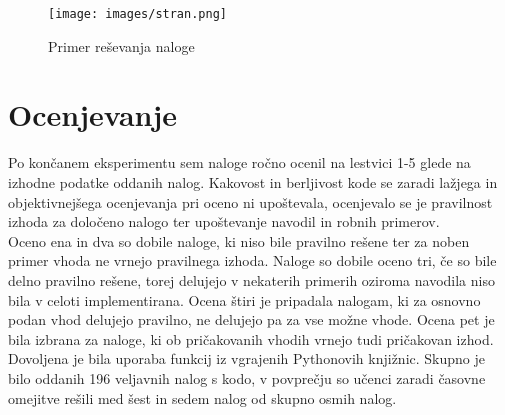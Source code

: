 \documentclass[a4paper,12pt,openright]{book}
\begin{document}
\begin{figure}[H]
    \centering
    \texttt{[image: images/stran.png]}
    \caption{Primer reševanja naloge}
    \label{fig:stran}
\end{figure}


\section{Ocenjevanje}
Po končanem eksperimentu sem naloge ročno ocenil na lestvici 1-5 glede na izhodne podatke oddanih nalog. Kakovost in berljivost kode se zaradi lažjega in objektivnejšega ocenjevanja pri oceno ni upoštevala, ocenjevalo se je pravilnost izhoda za določeno nalogo ter upoštevanje navodil in robnih primerov. \\
Oceno ena in dva so dobile naloge, ki niso bile pravilno rešene ter za noben primer vhoda ne vrnejo pravilnega izhoda. Naloge so dobile oceno tri, če so bile delno pravilno rešene, torej delujejo v nekaterih primerih oziroma navodila niso bila v celoti implementirana. Ocena štiri je pripadala nalogam, ki za osnovno podan vhod delujejo pravilno, ne delujejo pa za vse možne vhode. Ocena pet je bila izbrana za naloge, ki ob pričakovanih vhodih vrnejo tudi pričakovan izhod. Dovoljena je bila uporaba funkcij iz vgrajenih Pythonovih knjižnic.  Skupno je bilo oddanih 196 veljavnih nalog s kodo, v povprečju so učenci zaradi časovne omejitve rešili med šest in sedem nalog od skupno osmih nalog. 
\end{document}
